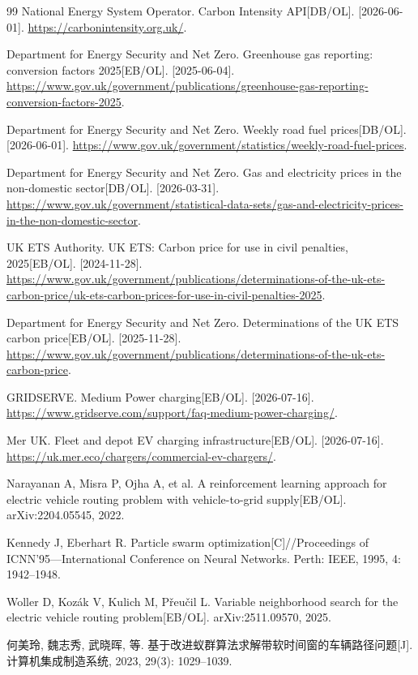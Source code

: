 \documentclass{setp-new}
\begin{document}
\begin{thebibliography}{99}
 National Energy System Operator. Carbon Intensity API[DB/OL]. [2026-06-01]. \url{https://carbonintensity.org.uk/}.

 Department for Energy Security and Net Zero. Greenhouse gas reporting: conversion factors 2025[EB/OL]. [2025-06-04]. \url{https://www.gov.uk/government/publications/greenhouse-gas-reporting-conversion-factors-2025}.

 Department for Energy Security and Net Zero. Weekly road fuel prices[DB/OL]. [2026-06-01]. \url{https://www.gov.uk/government/statistics/weekly-road-fuel-prices}.

 Department for Energy Security and Net Zero. Gas and electricity prices in the non-domestic sector[DB/OL]. [2026-03-31]. \url{https://www.gov.uk/government/statistical-data-sets/gas-and-electricity-prices-in-the-non-domestic-sector}.

 UK ETS Authority. UK ETS: Carbon price for use in civil penalties, 2025[EB/OL]. [2024-11-28]. \url{https://www.gov.uk/government/publications/determinations-of-the-uk-ets-carbon-price/uk-ets-carbon-prices-for-use-in-civil-penalties-2025}.

 Department for Energy Security and Net Zero. Determinations of the UK ETS carbon price[EB/OL]. [2025-11-28]. \url{https://www.gov.uk/government/publications/determinations-of-the-uk-ets-carbon-price}.

 GRIDSERVE. Medium Power charging[EB/OL]. [2026-07-16]. \url{https://www.gridserve.com/support/faq-medium-power-charging/}.

 Mer UK. Fleet and depot EV charging infrastructure[EB/OL]. [2026-07-16]. \url{https://uk.mer.eco/chargers/commercial-ev-chargers/}.

 Narayanan A, Misra P, Ojha A, et al. A reinforcement learning approach for electric vehicle routing problem with vehicle-to-grid supply[EB/OL]. arXiv:2204.05545, 2022.

 Kennedy J, Eberhart R. Particle swarm optimization[C]//Proceedings of ICNN'95---International Conference on Neural Networks. Perth: IEEE, 1995, 4: 1942--1948.

 Woller D, Koz\'{a}k V, Kulich M, P\v{r}eu\v{c}il L. Variable neighborhood search for the electric vehicle routing problem[EB/OL]. arXiv:2511.09570, 2025.

 何美玲, 魏志秀, 武晓晖, 等. 基于改进蚁群算法求解带软时间窗的车辆路径问题[J]. 计算机集成制造系统, 2023, 29(3): 1029--1039.


\end{thebibliography}
\end{document}
